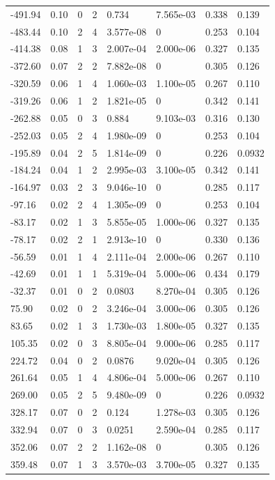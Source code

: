\documentclass[preview]{standalone}
\begin{document}
{{\begin{tabular}{L{1.2cm}C{1.2cm} C{0.3cm}C{0.5cm} C{1.4cm}C{1.4cm} C{1.4cm}C{1.4cm}}
  -491.94  &  0.10  & 0     &  2 &  0.734  & 7.565e-03  & 0.338 &  0.139   \\ 
  -483.44  &  0.10  & 2     &  4 &  3.577e-08  & 0  & 0.253 &  0.104   \\ 
  -414.38  &  0.08  & 1     &  3 &  2.007e-04  & 2.000e-06  & 0.327 &  0.135   \\ 
  -372.60  &  0.07  & 2     &  2 &  7.882e-08  & 0  & 0.305 &  0.126   \\ 
  -320.59  &  0.06  & 1     &  4 &  1.060e-03  & 1.100e-05  & 0.267 &  0.110   \\ 
  -319.26  &  0.06  & 1     &  2 &  1.821e-05  & 0  & 0.342 &  0.141   \\ 
  -262.88  &  0.05  & 0     &  3 &  0.884  & 9.103e-03  & 0.316 &  0.130   \\ 
  -252.03  &  0.05  & 2     &  4 &  1.980e-09  & 0  & 0.253 &  0.104   \\ 
  -195.89  &  0.04  & 2     &  5 &  1.814e-09  & 0  & 0.226 &  0.0932   \\ 
  -184.24  &  0.04  & 1     &  2 &  2.995e-03  & 3.100e-05  & 0.342 &  0.141   \\ 
  -164.97  &  0.03  & 2     &  3 &  9.046e-10  & 0  & 0.285 &  0.117   \\ 
  -97.16  &  0.02  & 2     &  4 &  1.305e-09  & 0  & 0.253 &  0.104   \\ 
  -83.17  &  0.02  & 1     &  3 &  5.855e-05  & 1.000e-06  & 0.327 &  0.135   \\ 
  -78.17  &  0.02  & 2     &  1 &  2.913e-10  & 0  & 0.330 &  0.136   \\ 
  -56.59  &  0.01  & 1     &  4 &  2.111e-04  & 2.000e-06  & 0.267 &  0.110   \\ 
  -42.69  &  0.01  & 1     &  1 &  5.319e-04  & 5.000e-06  & 0.434 &  0.179   \\ 
  -32.37  &  0.01  & 0     &  2 &  0.0803  & 8.270e-04  & 0.305 &  0.126   \\ 
  75.90  &  0.02  & 0     &  2 &  3.246e-04  & 3.000e-06  & 0.305 &  0.126   \\ 
  83.65  &  0.02  & 1     &  3 &  1.730e-03  & 1.800e-05  & 0.327 &  0.135   \\ 
  105.35  &  0.02  & 0     &  3 &  8.805e-04  & 9.000e-06  & 0.285 &  0.117   \\ 
  224.72  &  0.04  & 0     &  2 &  0.0876  & 9.020e-04  & 0.305 &  0.126   \\ 
  261.64  &  0.05  & 1     &  4 &  4.806e-04  & 5.000e-06  & 0.267 &  0.110   \\ 
  269.00  &  0.05  & 2     &  5 &  9.480e-09  & 0  & 0.226 &  0.0932   \\ 
  328.17  &  0.07  & 0     &  2 &  0.124  & 1.278e-03  & 0.305 &  0.126   \\ 
  332.94  &  0.07  & 0     &  3 &  0.0251  & 2.590e-04  & 0.285 &  0.117   \\ 
  352.06  &  0.07  & 2     &  2 &  1.162e-08  & 0  & 0.305 &  0.126   \\ 
  359.48  &  0.07  & 1     &  3 &  3.570e-03  & 3.700e-05  & 0.327 &  0.135   \\ 
\hline 
\end{tabular} 

}}
\end{document}
